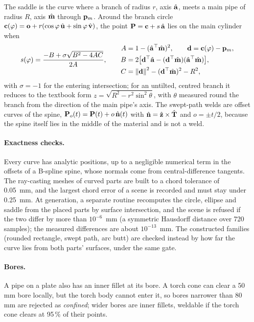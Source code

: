 The saddle is the curve where a branch of radius $r$, axis $\hat{\mathbf{a}}$, meets a main pipe
of radius $R$, axis $\hat{\mathbf{m}}$ through $\mathbf{p}_m$. Around the branch circle
$\mathbf{c}(\varphi)=\mathbf{o}+r(\cos\varphi\,\hat{\mathbf{u}}+\sin\varphi\,\hat{\mathbf{v}})$, the point
$\mathbf{P}=\mathbf{c}+s\,\hat{\mathbf{a}}$ lies on the main cylinder when
\begin{equation}
s(\varphi)=\frac{-B+\sigma\sqrt{B^2-4AC}}{2A},\qquad
\begin{aligned}
A&=1-(\hat{\mathbf{a}}^{\top}\hat{\mathbf{m}})^2,\qquad \mathbf{d}=\mathbf{c}(\varphi)-\mathbf{p}_m,\\
B&=2\big[\mathbf{d}^{\top}\hat{\mathbf{a}}-(\mathbf{d}^{\top}\hat{\mathbf{m}})(\hat{\mathbf{a}}^{\top}\hat{\mathbf{m}})\big],\\
C&=\left\lVert\mathbf{d}\right\rVert^2-(\mathbf{d}^{\top}\hat{\mathbf{m}})^2-R^2,
\end{aligned}
\label{eq:ws_saddle}
\end{equation}
with $\sigma=-1$ for the entering intersection; for an untilted, centred branch it reduces to
the textbook form $z=\sqrt{R^2-r^2\sin^2\theta}$, with $\theta$ measured round the branch from the
direction of the main pipe's axis. The swept-path welds are offset curves of the
spine, $\mathbf{P}_o(t)=\mathbf{P}(t)+o\,\hat{\mathbf{n}}(t)$ with $\hat{\mathbf{n}}=\hat{\mathbf{z}}\times\hat{\mathbf{T}}$
and $o=\pm t/2$, because the spine itself lies in the middle of the material and is not a
weld.

\paragraph{Exactness checks.} Every curve has analytic positions, up to a negligible numerical
term in the offsets of a B-spline spine, whose normals come from central-difference tangents. The
ray-casting meshes of curved parts are built to a chord tolerance of 0.05~mm, and the largest chord
error of a scene is recorded and must stay under 0.25~mm. At generation, a separate routine
recomputes the circle, ellipse and saddle from the placed parts by surface intersection, and the
scene is refused if the two differ by more than $10^{-6}$~mm (a symmetric Hausdorff distance over
720 samples); the measured differences are about $10^{-13}$~mm. The constructed families (rounded
rectangle, swept path, arc butt) are checked instead by how far the curve lies from both parts'
surfaces, under the same gate.

\paragraph{Bores.} A pipe on a plate also has an inner fillet at its bore. A torch cone can
clear a 50 mm bore locally, but the torch body cannot enter it, so bores narrower than
80 mm are rejected as \emph{confined}; wider bores are inner fillets, weldable if the torch cone
clears at 95\,\% of their points.

